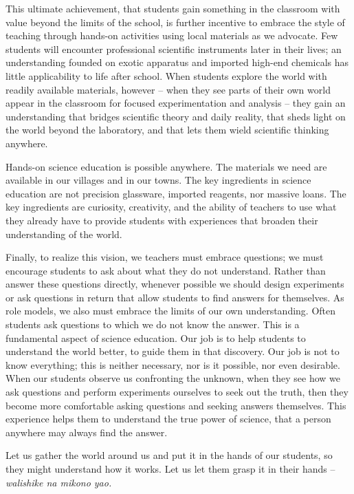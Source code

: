 This ultimate achievement, 
that students gain something in the classroom with 
value beyond the limits of the school, 
is further incentive to embrace the style 
of teaching through hands-on activities using local materials 
as we advocate. 
Few students will encounter professional scientific instruments 
later in their lives; 
an understanding founded on exotic apparatus and 
imported high-end chemicals has little applicability to life after school. 
When students explore the world with readily available materials, 
however -- 
when they see parts of their own world appear in the classroom 
for focused experimentation and analysis -- 
they gain an understanding that bridges scientific theory and 
daily reality, 
that sheds light on the world beyond the laboratory, 
and that lets them wield scientific thinking anywhere.

Hands-on science education is possible anywhere. 
The materials we need are available in our villages and in our towns. 
The key ingredients in science education are not precision glassware, 
imported reagents, nor massive loans. 
The key ingredients are curiosity, creativity, 
and the ability of teachers to use what they already have 
to provide students with experiences 
that broaden their understanding of the world.

Finally, to realize this vision, 
we teachers must embrace questions; 
we must encourage students to ask about what they do not understand. 
Rather than answer these questions directly, 
whenever possible we should design experiments 
or ask questions in return that allow students 
to find answers for themselves. 
As role models, we also must embrace the limits of our own understanding. 
Often students ask questions to which we do not know the answer. 
This is a fundamental aspect of science education. 
Our job is to help students to understand the world better, 
to guide them in that discovery. 
Our job is not to know everything; this is neither necessary, 
nor is it possible, nor even desirable. 
When our students observe us confronting the unknown, 
when they see how we ask questions and 
perform experiments ourselves to seek out the truth, 
then they become more comfortable asking questions 
and seeking answers themselves. 
This experience helps them to understand the true power of science, 
that a person anywhere may always find the answer.

Let us gather the world around us and 
put it in the hands of our students, 
so they might understand how it works. 
Let us let them grasp it in their hands -- 
\textit{walishike na mikono yao.}
